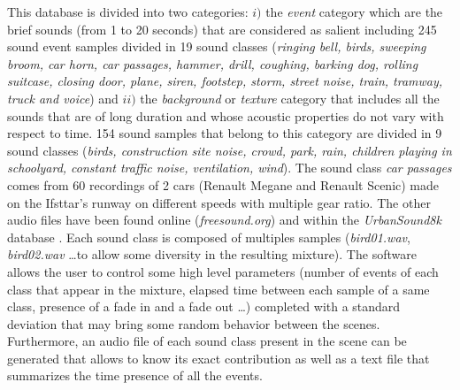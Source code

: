 \documentclass[twocolumn,a4paper,10pt]{article}
\begin{document}
This database is divided into two categories: $i)$ the \textit{event} category which are the brief sounds (from 1 to 20 seconds) that are considered as salient including 245 sound event samples divided in 19 sound classes (\textit{ringing bell, birds, sweeping broom, car horn, car passages, hammer, drill, coughing, barking dog, rolling suitcase, closing door, plane, siren, footstep, storm, street noise, train, tramway, truck and voice}) and $ii)$ the \textit{background} or \textit{texture} category that includes all the sounds that are of long duration and whose acoustic properties do not vary with respect to time. 154 sound samples that belong to this category are divided in 9 sound classes (\textit{birds, construction site noise, crowd, park, rain, children playing in schoolyard, constant traffic noise, ventilation, wind}). The sound class \textit{car passages} comes from 60 recordings of 2 cars (Renault Megane and Renault Scenic) made on the Ifsttar's runway on different speeds with multiple gear ratio. The other audio files have been found online (\textit{freesound.org}) and within the \textit{UrbanSound8k} database \cite{salamon_dataset_nodate}. Each sound class is composed of multiples samples (\textit{bird01.wav}, \textit{bird02.wav} \dots to allow some diversity in the resulting mixture).
The software allows the user to control some high level parameters (number of events of each class that appear in the mixture, elapsed time between each sample of a same class, presence of a fade in and a fade out \dots) completed with a standard deviation that may bring some random behavior between the scenes. Furthermore, an audio file of each sound class present in the scene can be generated that allows to know its exact contribution as well as a text file that summarizes the time presence of all the events.\\
\end{document}
